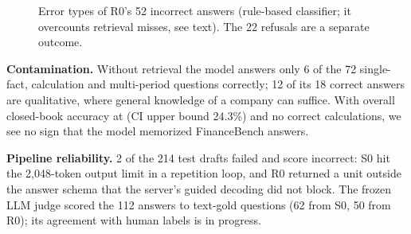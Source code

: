 \begin{figure}[h]
\centering\small

\caption{Error types of R0's 52 incorrect answers (rule-based classifier; it overcounts retrieval misses, see text). The 22 refusals are a separate outcome.}
\label{fig:errors}
\end{figure}

\textbf{Contamination.} Without retrieval the model answers only 6 of the 72 single-fact, calculation and multi-period questions correctly; 12 of its 18 correct answers are qualitative, where general knowledge of a company can suffice. With overall closed-book accuracy at \SzeroAll{} (CI upper bound 24.3\%) and no correct calculations, we see no sign that the model memorized FinanceBench answers.

\textbf{Pipeline reliability.} 2 of the 214 test drafts failed and score incorrect: S0 hit the 2{,}048-token output limit in a repetition loop, and R0 returned a unit outside the answer schema that the server's guided decoding did not block. The frozen LLM judge scored the 112 answers to text-gold questions (62 from S0, 50 from R0); its agreement with human labels is in progress.
